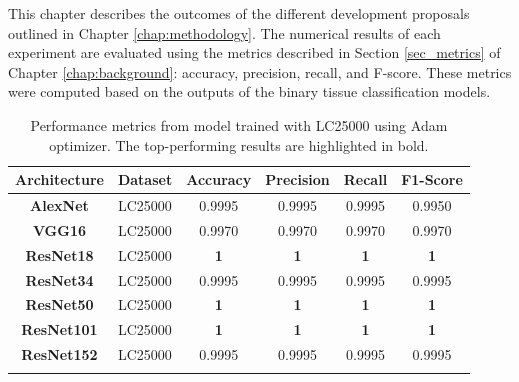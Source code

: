 \label{chap:results}

This chapter describes the outcomes of the different development proposals outlined in Chapter \ref{chap:methodology}. The numerical results of each experiment are evaluated using the metrics described in Section \ref{sec_metrics} of Chapter \ref{chap:background}: accuracy, precision, recall, and F-score. These metrics were computed based on the outputs of the binary tissue classification models.

\begin{table}[h!]
\centering
\caption{Performance metrics from model trained with \gls{LC25000} using Adam optimizer. The top-performing results are highlighted in bold.}
\label{table_lc25000_adam}

\begin{tabular}{|c|l|c|c|c|c|}
\hline
\textbf{Architecture} & \multicolumn{1}{c|}{\textbf{Dataset}}     & \textbf{Accuracy} & \textbf{Precision} & \textbf{Recall} & \textbf{F1-Score} \\ \hline
\textbf{AlexNet}      & LC25000                                   & 0.9995       & 0.9995             & 0.9995          & 0.9950            \\ \hline
\textbf{VGG16}        & LC25000                                   & 0.9970       & 0.9970             & 0.9970          & 0.9970            \\ \hline
\textbf{ResNet18}     & LC25000                                   & \textbf{1}            & \textbf{1}                  & \textbf{1}               & \textbf{1}                 \\ \hline
\textbf{ResNet34}     & LC25000                                   & 0.9995       & 0.9995             & 0.9995          & 0.9995            \\ \hline
\textbf{ResNet50}     & LC25000                                   & \textbf{1}            & \textbf{1}                  & \textbf{1}               & \textbf{1}                 \\ \hline
\textbf{ResNet101}    & LC25000                                  & \textbf{1}            & \textbf{1}                  & \textbf{1}               & \textbf{1}                 \\ \hline
\textbf{ResNet152}    & LC25000                                   & 0.9995       & 0.9995             & 0.9995          & 0.9995            \\ \hline
\multicolumn{1}{|l|}{} &                                       & \multicolumn{1}{l|}{} & \multicolumn{1}{l|}{} & \multicolumn{1}{l|}{} & \multicolumn{1}{l|}{} \\ \hline

\end{tabular}
\end{table}
